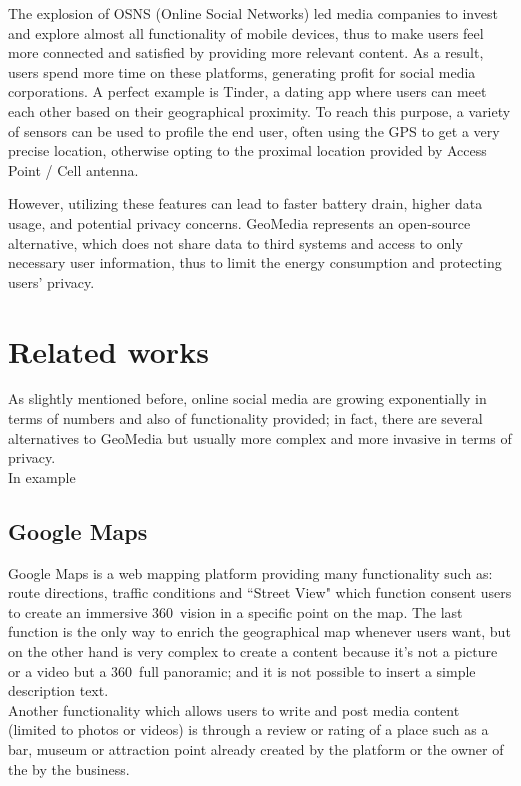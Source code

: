 \documentclass[conference]{IEEEtran}
\begin{document}
The explosion of OSNS (Online Social Networks) led media companies to invest and explore almost all functionality of mobile devices, thus to make users feel more connected and satisfied by providing more relevant content. As a result, users spend more time on these platforms, generating profit for social media corporations.
A perfect example is Tinder, a dating app where users can meet each other based on their geographical proximity.
To reach this purpose, a variety of sensors can be used to profile the end user, often using the GPS to get a very precise location, otherwise opting to the proximal location provided by Access Point / Cell antenna.

However, utilizing these features can lead to faster battery drain, higher data usage, and potential privacy concerns.
GeoMedia represents an open-source alternative, which does not share data to third systems and access to only necessary user information, thus to limit the energy consumption and protecting users' privacy.
\\

\section{Related works}

As slightly mentioned before, online social media are growing exponentially in terms of numbers and also of functionality provided; in fact, there are several alternatives to GeoMedia but usually more complex and more invasive in terms of privacy. 
\\
In example
\subsection{Google Maps}
Google Maps\cite{GoogleMaps} is a web mapping platform providing many functionality such as: route directions, traffic conditions and ``Street View"\cite{StreetView} which function consent users to create an immersive 360\textdegree \  vision in a specific point on the map.
The last function is the only way to enrich the geographical map whenever users want, but on the other hand is very complex to create a content because it's not a picture or a video but a 360\textdegree \ full panoramic; and it is not possible to insert a simple description text.
\\
Another functionality which allows users to write and post media content (limited to photos or videos) is through a review or rating of a place such as a bar, museum or attraction point already created by the platform or the owner of the by the business.
\end{document}
